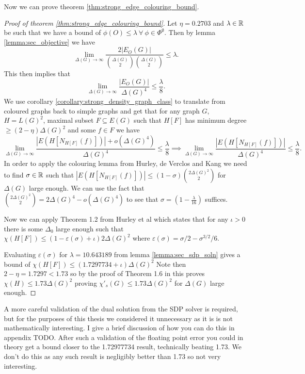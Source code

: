 Now we can prove theorem \ref{thm:strong_edge_colouring_bound}.
\begin{proof}[Proof of theorem \ref{thm:strong_edge_colouring_bound}]
    Let $\eta = 0.2703$ and $\lambda\in\mathbb{R}$ be such that we have a bound of
    $\phi(O) \leq \lambda\ \forall\ \phi\in\Phi^\emptyset$.
    Then by lemma \ref{lemma:sec_objective} we have
    \[
        \lim_{\Delta(G) \to \infty}
        \frac{2|E_O(G)|}{\binom{\Delta(G)}{2}\binom{\Delta(G)}{2}}
        \leq \lambda.
    \]
    This then implies that
    \[
        \lim_{\Delta(G) \to \infty}
        \frac{|E_O(G)|}{\Delta(G)^4}
        \leq \frac{\lambda}{8}.
    \]
    We use corollary \ref{corollary:strong_density_graph_class} to translate from
    coloured graphs back to simple graphs and get that for any graph $G$,
    $H = L(G)^2$, maximal subset $F\subseteq E(G)$ such that $H[F]$ has minimum degree
    $\geq (2-\eta)\Delta(G)^2$ and some $f\in F$ we have
    \[
        \lim_{\Delta(G) \to \infty}
        \frac{|E(H[N_{H[F]}(f)])| + o(\Delta(G)^4)}{\Delta(G)^4}
        \leq \frac{\lambda}{8}
        \implies
        \lim_{\Delta(G) \to \infty}
        \frac{|E(H[N_{H[F]}(f)])|}{\Delta(G)^4}
        \leq \frac{\lambda}{8}.
    \]
    In order to apply the colouring lemma from Hurley, de Verclos and Kang
    \cite{hurleyImprovedProcedureColouring2022} we need to find $\sigma\in\mathbb{R}$ such that
    $|E(H[N_{H[F]}(f)])| \leq (1-\sigma)\binom{2\Delta(G)^2}{2}$ for $\Delta(G)$ large
    enough. We can use the fact that
    $\binom{2\Delta(G)^2}{2} = 2\Delta(G)^4 - o(\Delta(G)^4)$
    to see that $\sigma = (1-\frac{\lambda}{16})$ suffices.

    Now we can apply Theorem 1.2 from Hurley et al \cite{hurleyImprovedProcedureColouring2022}
    which states that for any $\iota > 0$ there is some $\Delta_0$ large enough such that
    $\chi(H[F]) \leq (1-\varepsilon(\sigma) + \iota)2\Delta(G)^2$
    where $\varepsilon(\sigma) = \sigma/2 - \sigma^{3/2}/6$.

    Evaluating $\varepsilon(\sigma)$ for $\lambda = 10.643189$ from 
    lemma \ref{lemma:sec_sdp_soln} gives a bound of
    $\chi(H[F]) \leq (1.7297734 + \iota)\Delta(G)^2$
    Note then $2-\eta = 1.7297 < 1.73$ so by the proof of Theorem 1.6 in
    \cite{hurleyImprovedProcedureColouring2022}
    this proves $\chi(H) \leq 1.73\Delta(G)^2$ proving
    $\chi'_s(G) \leq 1.73\Delta(G)^2$ for $\Delta(G)$ large enough.
\end{proof}
\begin{note}
    A more careful validation of the dual solution from the SDP solver is required,
    but for the purposes of this thesis we considered it unnecessary as it is is not
    mathematically interesting. I give a brief discussion of how you can do this in
    appendix TODO.
    After such a validation of the floating point error you could in theory get
    a bound closer to the 1.72977734 result, technically beating 1.73. We don't do this
    as any such result is negligibly better than 1.73 so not very interesting.
\end{note}

